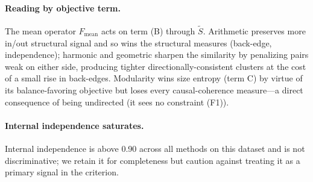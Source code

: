 \documentclass[table, 11pt]{article}
\begin{document}
\paragraph{Reading by objective term.}
The mean operator $F_{\text{mean}}$ acts on term (B) through $\tilde S$.
Arithmetic preserves more in/out structural signal and so wins the
structural measures (back-edge, independence); harmonic and geometric
sharpen the similarity by penalizing pairs weak on either side,
producing tighter directionally-consistent clusters at the cost of a
small rise in back-edges. Modularity wins size entropy (term C) by
virtue of its balance-favoring objective but loses every
causal-coherence measure---a direct consequence of being undirected
(it sees no constraint (F1)).

\paragraph{Internal independence saturates.}
Internal independence is above 0.90 across all methods on this
dataset and is not discriminative; we retain it for completeness but
caution against treating it as a primary signal in the criterion.
\end{document}
